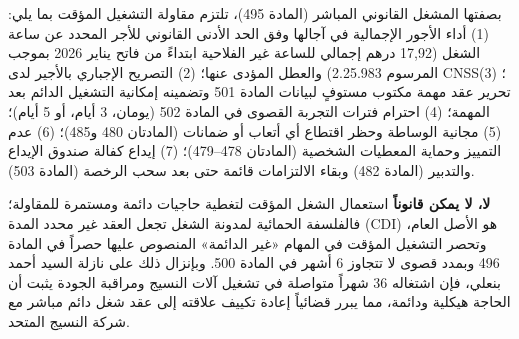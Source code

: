 \vspace{0.2cm}\par\smallskip
بصفتها المشغل القانوني المباشر (المادة \textenglish{495})، تلتزم مقاولة التشغيل المؤقت بما يلي:
(\textenglish{1}) أداء الأجور الإجمالية في آجالها وفق الحد الأدنى القانوني للأجر المحدد عن ساعة الشغل (\textenglish{17,92} درهم إجمالي للساعة غير الفلاحية ابتداءً من فاتح يناير \textenglish{2026} بموجب المرسوم \textenglish{2.25.983}) والعطل المؤدى عنها؛
(\textenglish{2}) التصريح الإجباري بالأجير لدى \textenglish{CNSS}؛
(\textenglish{3}) تحرير عقد مهمة مكتوب مستوفٍ لبيانات المادة \textenglish{501} وتضمينه إمكانية التشغيل الدائم بعد المهمة؛
(\textenglish{4}) احترام فترات التجربة القصوى في المادة \textenglish{502} (يومان، \textenglish{3} أيام، أو \textenglish{5} أيام)؛
(\textenglish{5}) مجانية الوساطة وحظر اقتطاع أي أتعاب أو ضمانات (المادتان \textenglish{480} و\textenglish{485})؛
(\textenglish{6}) عدم التمييز وحماية المعطيات الشخصية (المادتان \textenglish{478}--\textenglish{479})؛
(\textenglish{7}) إيداع كفالة صندوق الإيداع والتدبير (المادة \textenglish{482}) وبقاء الالتزامات قائمة حتى بعد سحب الرخصة (المادة \textenglish{503}).

\vspace{0.25cm}\par\smallskip
\textbf{لا، لا يمكن قانوناً} استعمال الشغل المؤقت لتغطية حاجيات دائمة ومستمرة للمقاولة؛ فالفلسفة الحمائية لمدونة الشغل تجعل العقد غير محدد المدة (\textenglish{CDI}) هو الأصل العام، وتحصر التشغيل المؤقت في المهام «غير الدائمة» المنصوص عليها حصراً في المادة \textenglish{496} وبمدد قصوى لا تتجاوز \textenglish{6} أشهر في المادة \textenglish{500}. وبإنزال ذلك على نازلة السيد أحمد بنعلي، فإن اشتغاله \textenglish{36} شهراً متواصلة في تشغيل آلات النسيج ومراقبة الجودة يثبت أن الحاجة هيكلية ودائمة، مما يبرر قضائياً إعادة تكييف علاقته إلى عقد شغل دائم مباشر مع شركة النسيج المتحد.

